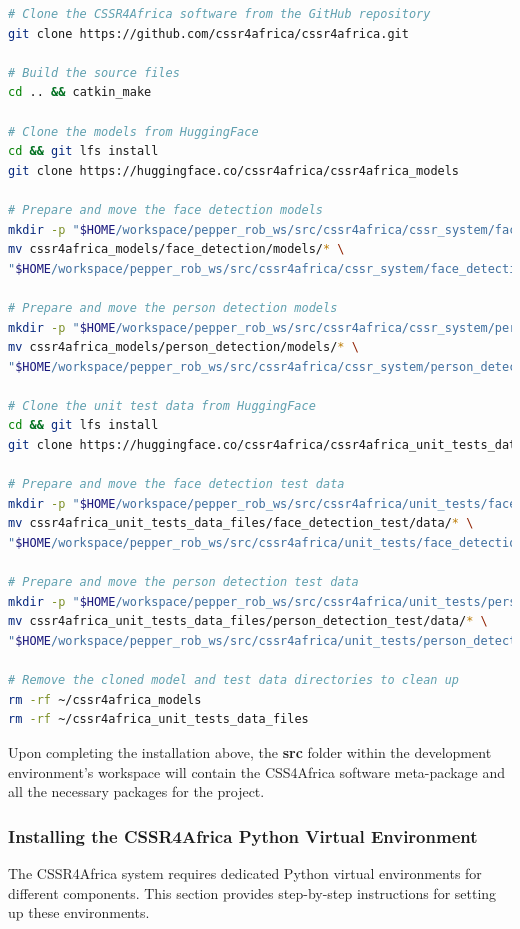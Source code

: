 \documentclass{CSSRforAfrica}
\begin{document}
{\begin{lstlisting}[style=withoutNumbering, language=bash]
# Clone the CSSR4Africa software from the GitHub repository
git clone https://github.com/cssr4africa/cssr4africa.git

# Build the source files
cd .. && catkin_make

# Clone the models from HuggingFace
cd && git lfs install
git clone https://huggingface.co/cssr4africa/cssr4africa_models

# Prepare and move the face detection models
mkdir -p "$HOME/workspace/pepper_rob_ws/src/cssr4africa/cssr_system/face_detection/models"
mv cssr4africa_models/face_detection/models/* \
"$HOME/workspace/pepper_rob_ws/src/cssr4africa/cssr_system/face_detection/models/"

# Prepare and move the person detection models
mkdir -p "$HOME/workspace/pepper_rob_ws/src/cssr4africa/cssr_system/person_detection/models"
mv cssr4africa_models/person_detection/models/* \
"$HOME/workspace/pepper_rob_ws/src/cssr4africa/cssr_system/person_detection/models/"

# Clone the unit test data from HuggingFace
cd && git lfs install
git clone https://huggingface.co/cssr4africa/cssr4africa_unit_tests_data_files

# Prepare and move the face detection test data
mkdir -p "$HOME/workspace/pepper_rob_ws/src/cssr4africa/unit_tests/face_detection_test/data"
mv cssr4africa_unit_tests_data_files/face_detection_test/data/* \
"$HOME/workspace/pepper_rob_ws/src/cssr4africa/unit_tests/face_detection_test/data/"

# Prepare and move the person detection test data
mkdir -p "$HOME/workspace/pepper_rob_ws/src/cssr4africa/unit_tests/person_detection_test/data"
mv cssr4africa_unit_tests_data_files/person_detection_test/data/* \
"$HOME/workspace/pepper_rob_ws/src/cssr4africa/unit_tests/person_detection_test/data/"

# Remove the cloned model and test data directories to clean up
rm -rf ~/cssr4africa_models
rm -rf ~/cssr4africa_unit_tests_data_files
\end{lstlisting}

\noindent Upon completing the installation above, the \textbf{src} folder within the development environment's workspace will contain the CSS4Africa software meta-package and all the necessary packages for the project. 

\subsubsection{Installing the CSSR4Africa Python Virtual Environment}
The CSSR4Africa system requires dedicated Python virtual environments for different components. This section provides step-by-step instructions for setting up these environments.


}
\end{document}
